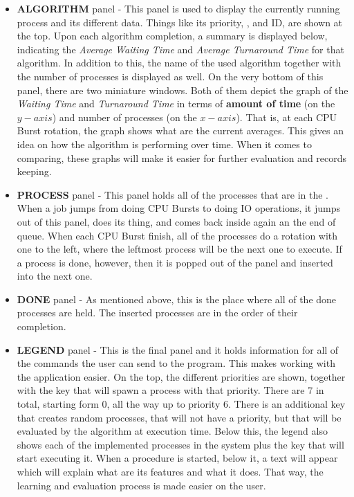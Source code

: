 \documentclass{article}
\newcommand{\code}[1]{\codeinline{\texttt{#1}}}
\begin{document}
\begin{itemize}
\item \textbf{ALGORITHM} panel - This panel is used to display the currently running process and its different data. Things like its priority, \code{ttl}, and ID, are shown at the top. Upon each algorithm completion, a summary is displayed below, indicating the \textit{Average Waiting Time} and \textit{Average Turnaround Time} for that algorithm. In addition to this, the name of the used algorithm together with the number of processes is displayed as well. On the very bottom of this panel, there are two miniature windows. Both of them depict the graph of the \textit{Waiting Time} and \textit{Turnaround Time} in terms of \textbf{amount of time} (on the $y-axis$) and number of processes (on the $x-axis$). That is, at each CPU Burst rotation, the graph shows what are the current averages. This gives an idea on how the algorithm is performing over time. When it comes to comparing, these graphs will make it easier for further evaluation and records keeping.
\item \textbf{PROCESS} panel - This panel holds all of the processes that are in the \code{ready\_queue}. When a job jumps from doing CPU Bursts to doing IO operations, it jumps out of this panel, does its thing, and comes back inside again an the end of queue. When each CPU Burst finish, all of the processes do a rotation with one to the left, where the leftmost process will be the next one to execute. If a process is done, however, then it is popped out of the panel and inserted into the next one.
\item \textbf{DONE} panel - As mentioned above, this is the place where all of the done processes are held. The inserted processes are in the order of their completion.
\item \textbf{LEGEND} panel - This is the final panel and it holds information for all of the commands the user can send to the program. This makes working with the application easier. On the top, the different priorities are shown, together with the key that will spawn a process with that priority. There are 7 in total, starting form 0, all the way up to priority 6. There is an additional key that creates random processes, that will not have a priority, but that will be evaluated by the algorithm at execution time. Below this, the legend also shows each of the implemented processes in the system plus the key that will start executing it. When a procedure is started, below it, a text will appear which will explain what are its features and what it does. That way, the learning and evaluation process is made easier on the user.
\end{itemize}
\end{document}
